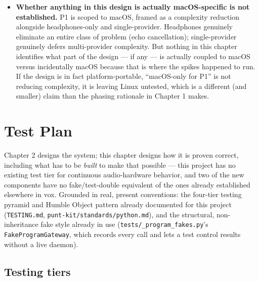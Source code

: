 \documentclass[a4paper,11pt]{report}
\begin{document}
\begin{itemize}
    an internal, developer-facing record of state transitions, detector
    decisions, and per-segment latencies is a different thing and is not
    mentioned. Given Phase 1's entire purpose is validating a subjective
    bar (``would a human rather have this conversation than type it''),
    there is currently no way to determine \emph{why} a given call felt
    bad --- a false barge-in trigger, a slow synthesis segment, a missed
    turn end --- after the fact.
  \item \textbf{Whether anything in this design is actually macOS-specific
    is not established.} P1 is scoped to macOS, framed as a complexity
    reduction alongside headphones-only and single-provider. Headphones
    genuinely eliminate an entire class of problem (echo cancellation);
    single-provider genuinely defers multi-provider complexity. But
    nothing in this chapter identifies what part of the design --- if
    any --- is actually coupled to macOS versus incidentally macOS
    because that is where the spikes happened to run. If the design is
    in fact platform-portable, ``macOS-only for P1'' is not reducing
    complexity, it is leaving Linux untested, which is a different
    (and smaller) claim than the phasing rationale in Chapter 1 makes.
\end{itemize}

\chapter{Test Plan}

Chapter 2 designs the system; this chapter designs how it is proven
correct, including what has to be \emph{built} to make that possible ---
this project has no existing test tier for continuous audio-hardware
behavior, and two of the new components have no fake/test-double
equivalent of the ones already established elsewhere in vox. Grounded in
real, present conventions: the four-tier testing pyramid and Humble
Object pattern already documented for this project (\texttt{TESTING.md},
\texttt{punt-kit/standards/python.md}), and the structural, non-inheritance
fake style already in use (\texttt{tests/\_program\_fakes.py}'s
\texttt{FakeProgramGateway}, which records every call and lets a test
control results without a live daemon).

\section{Testing tiers}
\end{document}
